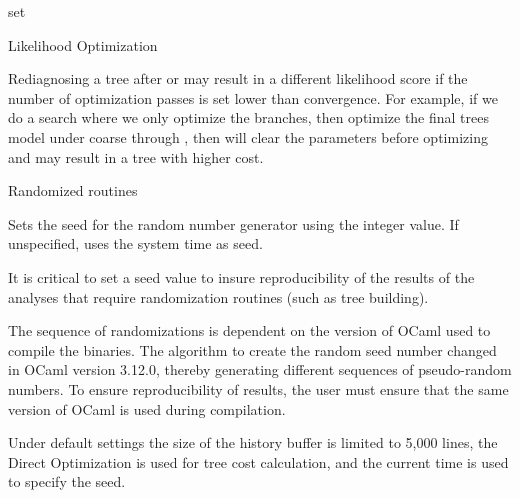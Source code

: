 \begin{command}{set}{}
\begin{arguments}
\begin{argumentgroup}{Likelihood Optimization}
            \begin{statement}
                Rediagnosing a tree after  or
                 may result in a different likelihood score if
                the number of optimization passes is set lower than convergence.
                For example, if we do a search where we only optimize the
                branches, then optimize the final trees model under coarse
                through , then \poy will clear the
                parameters before optimizing and may result in a tree with
                higher cost.
            \end{statement}

        \end{argumentgroup}
        
        \begin{argumentgroup}{Randomized routines}
            {}

                {Sets the seed for the random number generator using the integer 
                value. If unspecified, \poy uses the system time as seed.}
                {}

            \begin{statement}
                It is critical to set a seed value to insure reproducibility of
                the results of the analyses that require randomization routines
                (such as tree building).
            \end{statement}
     
            \begin{statement}
                The sequence of randomizations is dependent on the version of
                OCaml used to compile the binaries. The algorithm to create the
                random seed number changed in OCaml version 3.12.0, thereby
                generating different sequences of pseudo-random numbers.  To
                ensure reproducibility of results, the user must ensure that the
                same version of OCaml is used during compilation.
            \end{statement}
    
        \end{argumentgroup}

    \end{arguments}

        {Under default settings the size of the history buffer is limited to
        5,000 lines, the Direct Optimization is used for tree cost calculation,
        and the current time is used to specify the seed.}


\end{command}
